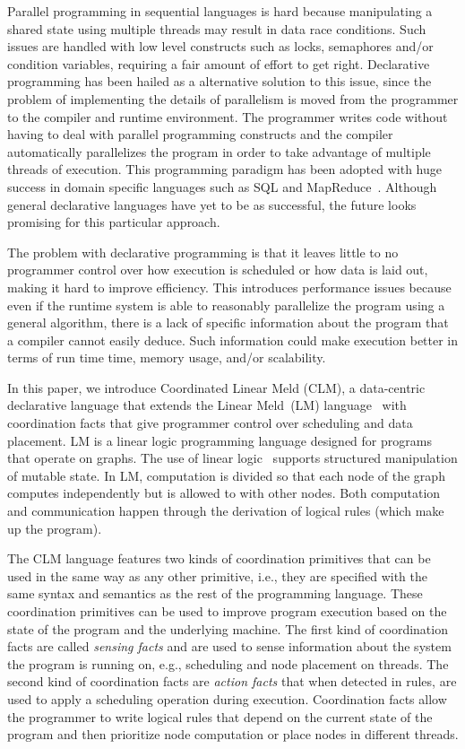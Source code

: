 Parallel programming in sequential languages is hard because manipulating a
shared state using multiple threads may result in data race conditions. Such
issues are handled with low level constructs such as locks, semaphores and/or condition
variables, requiring a fair amount of effort to get right.  Declarative
programming has been hailed as a alternative solution to this issue, since the problem of
implementing the details of parallelism is moved from the programmer to the
compiler and runtime environment. The programmer writes code without having to deal with
parallel programming constructs and the compiler automatically parallelizes the
program in order to take advantage of multiple threads of execution.  This
programming paradigm has been adopted with huge success in domain specific
languages such as SQL and MapReduce~\cite{Dean:2008:MSD:1327452.1327492}.
Although general declarative languages have yet to be as successful, the future
looks promising for this particular approach.

The problem with declarative programming is that it leaves little to no
programmer control over how execution is scheduled or how data is laid out,
making it hard to improve efficiency. This introduces
performance issues because even if the runtime system is able to
reasonably parallelize the program using a general algorithm, there
is a lack of specific information about the program that a compiler
cannot easily deduce. Such information could make execution better in
terms of run time time, memory usage, and/or scalability.

In this paper, we introduce Coordinated Linear Meld (CLM), a data-centric declarative
language that extends the Linear Meld~(LM)
language~\cite{cruz-iclp14,cruz-ppdp14} with coordination facts that give
programmer control over scheduling and data placement. LM is a linear logic
programming language designed for programs that operate on graphs.  The use
of linear logic~\cite{girard-87} supports structured manipulation of mutable
state. In LM, computation is divided so that each node of the graph computes
independently but is allowed to  with other nodes.  Both
computation and communication happen through the derivation of logical rules
(which make up the program).

The CLM language features two kinds of coordination primitives that can be used in the same
way as any other primitive, i.e., they are specified with the same
syntax and semantics as the rest of the programming language. These coordination
primitives can be used to improve program execution based on the state of the
program and the underlying machine. The first kind of coordination facts are
called \emph{sensing facts} and are used to sense information about the system
the program is running on, e.g., scheduling and node placement on threads. The
second kind of coordination facts are \emph{action facts} that when detected in
rules, are used to apply a scheduling operation during execution. Coordination
facts allow the programmer to write logical rules that depend on the current
state of the program and then prioritize node computation or place nodes in
different threads.

